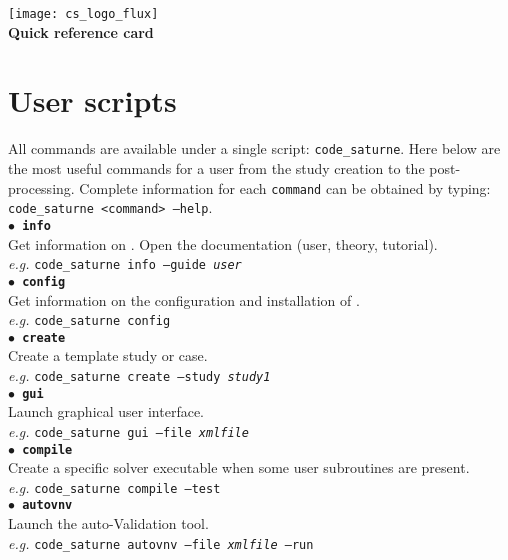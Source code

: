 \documentclass[a4paper,11pt]{article}
\newcommand{\refword}[1]{\texttt{$\bullet$ \bf{#1}}}
\begin{document}
\begin{multicols*}{3}

\begin{center}
  \texttt{[image: cs\_logo\_flux]}
  {\Large {\bf \CS~\verscs\\Quick reference card}}
\end{center}


\section*{User scripts}

All \CS commands are available under a single script: \texttt{code\_saturne}.
Here below are the most useful commands for a \CS user from the study
creation to the post-processing. Complete information for each
\texttt{command} can be obtained by typing:\\
\texttt{code\_saturne <command> --help}.\\

\refword{info}\\
Get information on \CS. Open the documentation (user, theory,
tutorial).\\
\textit{e.g.} \texttt{code\_saturne info --guide \emph{user}}\\

\refword{config}\\
Get information on the configuration and installation of \CS.\\
\textit{e.g.} \texttt{code\_saturne config}\\

\refword{create}\\
Create a \CS template study or case.\\
\textit{e.g.} \texttt{code\_saturne create --study \emph{study1}}\\

\refword{gui}\\
Launch \CS graphical user interface.\\
\textit{e.g.} \texttt{code\_saturne gui --file \emph{xmlfile}}\\

\refword{compile}\\
Create a specific solver executable when some user subroutines are
present.\\
\textit{e.g.} \texttt{code\_saturne compile --test}\\

\refword{autovnv}\\
Launch the auto-Validation tool.\\
\textit{e.g.} \texttt{code\_saturne autovnv --file \emph{xmlfile} --run}\\



\end{multicols*}
\end{document}
